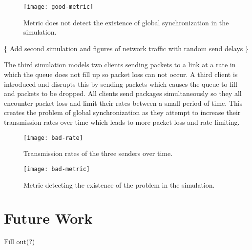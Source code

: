 \documentclass{article}
\begin{document}
	\begin{figure}[H]
		\centering
		\texttt{[image: good-metric]}
		\caption{Metric does not detect the existence of global synchronization in the simulation.}
	\end{figure}
	
																			\{ Add second simulation and figures of network traffic with random send delays \}\newline
																			
	The third simulation models two clients sending packets to a link at a rate in which the queue does not fill up so packet loss can not occur. A third client is introduced and disrupts this by sending packets which causes the queue to fill and packets to be dropped. All clients send packages simultaneously so they all encounter packet loss and limit their rates between a small period of time. This creates the problem of global synchronization as they attempt to increase their transmission rates over time which leads to more packet loss and rate limiting.\newline
	\begin{figure}[H]
		\centering
		\texttt{[image: bad-rate]}
		\caption{Transmission rates of the three senders over time.}
	\end{figure}

	\begin{figure}[H]
		\centering
		\texttt{[image: bad-metric]}
		\caption{Metric detecting the existence of the problem in the simulation.}
	\end{figure}

\section{Future Work}
Fill out(?)



\end{document}

